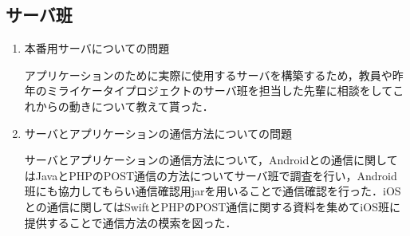 \subsection{サーバ班}
\begin{enumerate}
\item 本番用サーバについての問題
\par
アプリケーションのために実際に使用するサーバを構築するため，教員や昨年のミライケータイプロジェクトのサーバ班を担当した先輩に相談をしてこれからの動きについて教えて貰った．
\item サーバとアプリケーションの通信方法についての問題
\par
サーバとアプリケーションの通信方法について，Androidとの通信に関してはJavaとPHPのPOST通信の方法についてサーバ班で調査を行い，Android班にも協力してもらい通信確認用jarを用いることで通信確認を行った．iOSとの通信に関してはSwiftとPHPのPOST通信に関する資料を集めてiOS班に提供することで通信方法の模索を図った．
\end{enumerate}
